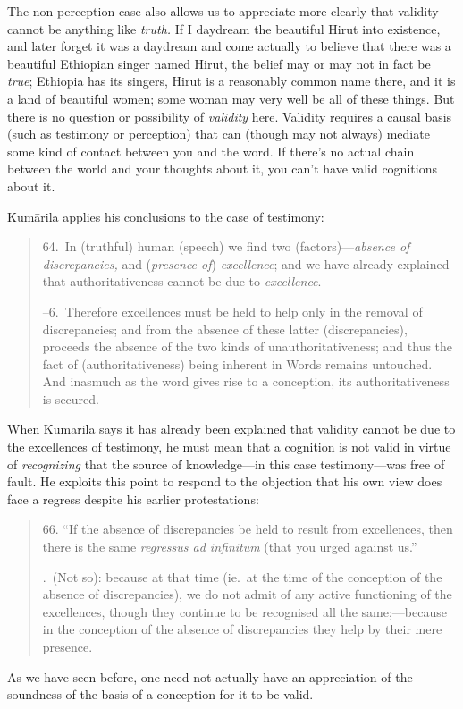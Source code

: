 \documentclass[11pt,letterpaper,oneside]{amsart}
\newenvironment{squote}{\begin{quote}\sf\small}{\rm\end{quote}} %
\begin{document}
The non-perception case also allows us to appreciate more clearly that validity cannot be anything like \emph{truth.} If I daydream the beautiful Hirut into existence, and later forget it was a daydream and come actually to believe that there was a beautiful Ethiopian singer named Hirut, the belief may or may not in fact be \emph{true}; Ethiopia has its singers, Hirut is a reasonably common name there, and it is a land of beautiful women; some woman may very well be all of these things. But there is no question or possibility of \emph{validity} here. Validity requires a causal basis (such as testimony or perception) that can (though may not always) mediate some kind of contact between you and the word. If there's no actual chain between the world and your thoughts about it, you can't have valid cognitions about it.%

Kum\=arila applies his conclusions to the case of testimony:\begin{squote}64.\ In (truthful) human (speech) we find two (factors)---\emph{absence of discrepancies,} and (\emph{presence of}) \emph{excellence}; and we have already explained that authoritativeness cannot be due to \emph{excellence}.

--6.\ Therefore excellences must be held to help only in the removal of discrepancies; and from the absence of these latter (discrepancies), proceeds the absence of the two kinds of unauthoritativeness; and thus the fact of (authoritativeness) being inherent in Words remains untouched. And inasmuch as the word gives rise to a conception, its authoritativeness is secured.\end{squote} When Kum\=arila says it has already been explained that validity cannot be due to the excellences of testimony, he must mean that a cognition is not valid in virtue of \emph{recognizing} that the source of knowledge---in this case testimony---was free of fault. He exploits this point to respond to the objection that his own view does face a regress despite his earlier protestations:\begin{squote}66. ``If the absence of discrepancies be held to result from excellences, then there is the same \emph{regressus ad infinitum} (that you urged against us.''

.\ (Not so): because at that time (ie.\ at the time of the conception of the absence of discrepancies), we do not admit of any active functioning of the excellences, though they continue to be recognised all the same;---because in the conception of the absence of discrepancies they help by their mere presence.\end{squote} As we have seen before, one need not actually have an appreciation of the soundness of the basis of a conception for it to be valid.
\end{document}

